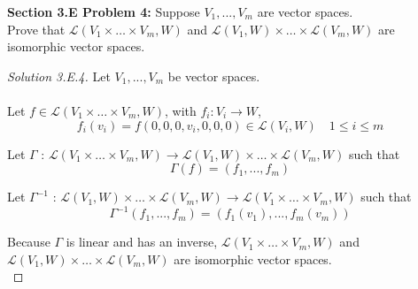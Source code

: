 \documentclass[12pt]{article}
\begin{document}
\vspace{\baselineskip}
\vspace{\baselineskip}

\noindent \textbf{Section 3.E Problem 4: } Suppose $V_1, ..., V_m$ are vector spaces.\\Prove that $\mathcal{L} (V_1 \times \dots \times V_m, W)  $ and $\mathcal{L}(V_1, W) \times \dots \times \mathcal{L} (V_m,W) $ are isomorphic vector spaces.
	
	\begin{proof}[Solution 3.E.4]
		Let $V_1, ..., V_m$ be vector spaces. 
		\\ \\
		Let $f \in \mathcal{L} (V_1 \times \dots \times V_m, W)$, with $ f_i: V_i \rightarrow W $, $$f_i(v_i) = f(0,0,0,v_i,0,0,0) \in \mathcal{L}(V_i,W) \quad 1 \leq i \leq m$$
		
		Let $\Gamma$ : $\mathcal{L} (V_1 \times \dots \times V_m, W) \rightarrow \mathcal{L}(V_1, W) \times \dots \times \mathcal{L} (V_m,W)$ such that $$\Gamma(f) = (f_1 , ..., f_m)$$
		
		Let $\Gamma^{-1}$ : $\mathcal{L}(V_1, W) \times \dots \times \mathcal{L} (V_m,W) \rightarrow \mathcal{L} (V_1 \times \dots \times V_m, W)$ such that $$\Gamma^{-1} (f_1, ..., f_m) = (f_1(v_1), ... , f_m(v_m))$$
		
		Because $\Gamma$ is linear and has an inverse, $\mathcal{L} (V_1 \times \dots \times V_m, W)  $ and $\mathcal{L}(V_1, W) \times \dots \times \mathcal{L} (V_m,W) $ are isomorphic vector spaces. \\
	\end{proof}
\end{document}
